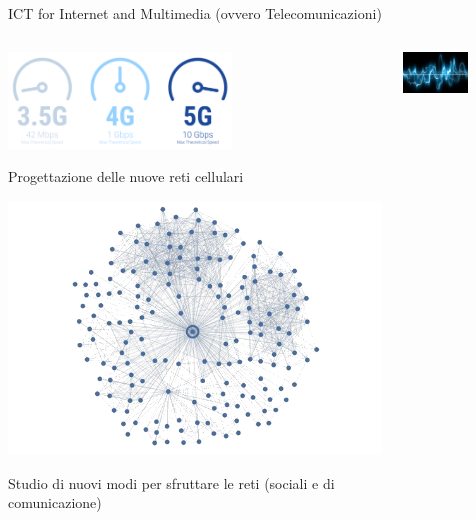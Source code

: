 \documentclass{beamer}
\begin{document}
	\begin{frame}{ICT for Internet and Multimedia (ovvero Telecomunicazioni)}
		\begin{columns}
			\begin{column}{0.4\textwidth}
				\centering
				\includegraphics[width=0.6\textwidth]{5G.png}

				Progettazione delle nuove reti cellulari

				\vspace{0.4cm}
				\includegraphics[width=\textwidth]{Grafo.png}

				Studio di nuovi modi per sfruttare le reti (sociali e di comunicazione)
			\end{column}
			\begin{column}{0.4\textwidth}
				\centering
				\includegraphics[width=0.6\textwidth]{signals.jpeg}


\end{column}
\end{columns}
\end{frame}
\end{document}
